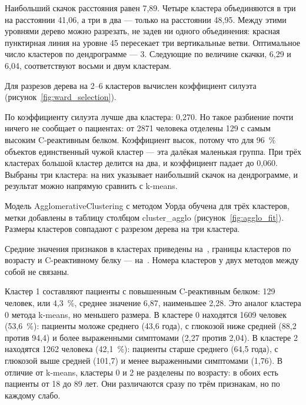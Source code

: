 \documentclass[a4paper,14pt]{extarticle}
\begin{document}
Наибольший скачок расстояния равен 7,89. Четыре кластера объединяются в три на расстоянии 41,06, а три в два — только на расстоянии 48,95. Между этими уровнями дерево можно разрезать, не задев ни одного объединения: красная пунктирная линия на уровне 45 пересекает три вертикальные ветви. Оптимальное число кластеров по дендрограмме — 3. Следующие по величине скачки, 6,29 и 6,04, соответствуют восьми и двум кластерам.

Для разрезов дерева на 2–6 кластеров вычислен коэффициент силуэта (рисунок~\ref{fig:ward_selection}).


По коэффициенту силуэта лучше два кластера: 0,270. Но такое разбиение почти ничего не сообщает о пациентах: от 2871 человека отделены 129 с самым высоким C-реактивным белком. Коэффициент высок, потому что для 96~\% объектов единственный чужой кластер — эта далёкая маленькая группа. При трёх кластерах большой кластер делится на два, и коэффициент падает до 0,060. Выбраны три кластера: на них указывает наибольший скачок на дендрограмме, и результат можно напрямую сравнить с k-means.

Модель AgglomerativeClustering с методом Уорда обучена для трёх кластеров, метки добавлены в таблицу столбцом cluster\_agglo (рисунок~\ref{fig:agglo_fit}). Размеры кластеров совпадают с разрезом дерева на три кластера.


Средние значения признаков в кластерах приведены на~, границы кластеров по возрасту и C-реактивному белку — на~. Номера кластеров у двух методов между собой не связаны.



Кластер 1 составляют пациенты с повышенным C-реактивным белком: 129 человек, или 4,3~\%, среднее значение 6,87, наименьшее 2,28. Это аналог кластера 0 метода k-means, но меньшего размера. В кластере 0 находятся 1609 человек (53,6~\%): пациенты моложе среднего (43,6 года), с глюкозой ниже средней (88,2 против 94,4) и более выраженными симптомами (2,27 против 2,04). В кластере 2 находятся 1262 человека (42,1~\%): пациенты старше среднего (64,5 года), с глюкозой выше средней (101,7) и менее выраженными симптомами (1,76). В отличие от k-means, кластеры 0 и 2 не разделены по возрасту: в обоих есть пациенты от 18 до 89 лет. Они различаются сразу по трём признакам, но по каждому слабо.
\end{document}
